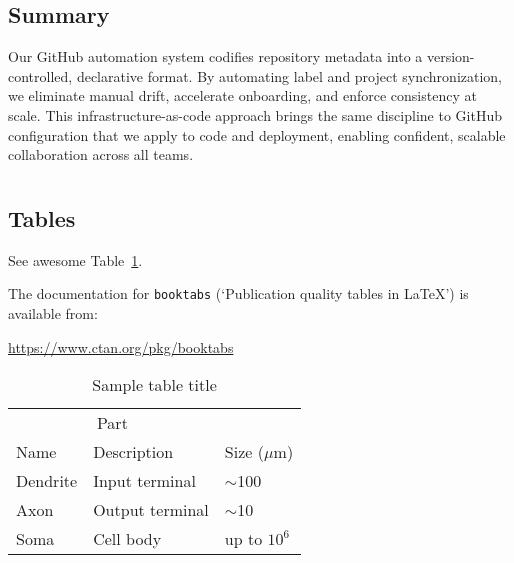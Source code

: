 \documentclass{article}
\begin{document}
\subsection{Summary}

Our GitHub automation system codifies repository metadata into a version-controlled,
declarative format. By automating label and project synchronization, we
eliminate manual drift, accelerate onboarding, and enforce consistency at scale.
This infrastructure-as-code approach brings the same discipline to GitHub configuration
that we apply to code and deployment, enabling confident, scalable collaboration
across all teams.

  \section{}


  \subsection{Tables}
  See awesome Table~\ref{tab:table}.

  The documentation for \verb+booktabs+ (`Publication quality tables in LaTeX')
  is available from:
  \begin{center}
    \url{https://www.ctan.org/pkg/booktabs}
  \end{center}

  \begin{table}
    \caption{Sample table title}
    \centering
    \begin{tabular}{lll}
      \toprule \multicolumn{2}{c}{Part} \\
      \cmidrule(r){1-2} Name           & Description     & Size ($\mu$m)  \\
      \midrule Dendrite                & Input terminal  & $\sim$100      \\
      Axon                             & Output terminal & $\sim$10       \\
      Soma                             & Cell body       & up to $10^{6}$ \\
      \bottomrule
    \end{tabular}
    \label{tab:table}
  \end{table}
\end{document}
